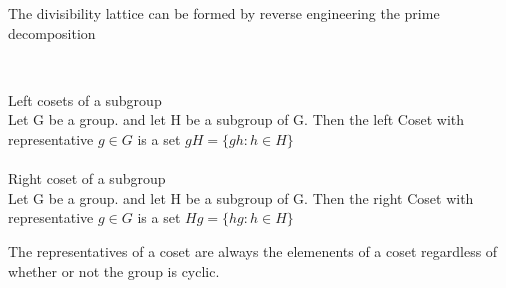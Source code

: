 \documentclass[11pt]{article}
\theoremstyle{definition}  %
\newcommand{\block}[2]{\begin{tcolorbox}[title={#1}]{#2}\end{tcolorbox}}
\begin{document}
\block{new idea?}{The divisibility lattice can be formed by reverse engineering the prime decomposition\\}\\
\block{Definition}{
Left cosets of a subgroup\\
Let G be a group. and let H be a subgroup of G. Then the left Coset with representative $g\in G$ is a set $gH=\{gh:h\in H \}$
\\\\
Right coset of a subgroup\\
Let G be a group. and let H be a subgroup of G. Then the right Coset with representative $g\in G$ is a set $Hg=\{hg:h\in H \}$
}
The representatives of a coset are always the elemenents of a coset regardless of whether or not the group is cyclic.
\end{document}
